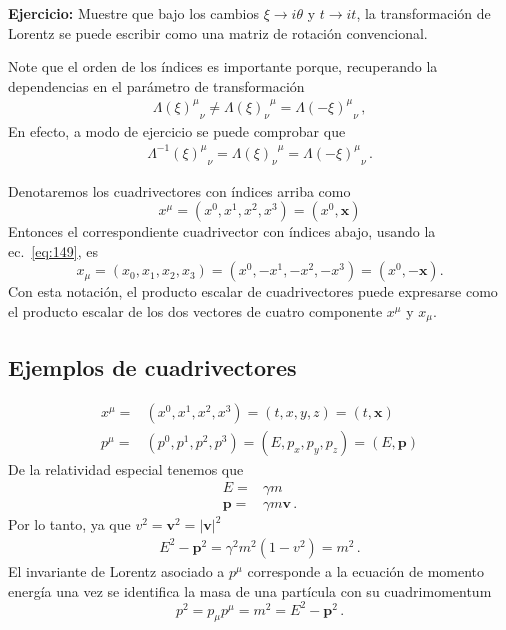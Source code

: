 \textbf{Ejercicio:} Muestre que bajo los cambios $\xi\to i\theta$ y $t\to it$, la transformación de Lorentz se puede escribir como una matriz de rotación convencional.

Note que el orden de los índices es importante porque, recuperando la dependencias en el parámetro de transformación
\begin{align}
  {\Lambda(\xi)^{\mu}}_{\nu}\ne {\Lambda(\xi)_{\nu}}^{\mu}={\Lambda(-\xi)^{\mu}}_{\nu}\,,
\end{align}
En efecto, a modo de ejercicio se puede comprobar que
\begin{align}
{\Lambda^{-1}(\xi)^{\mu}}_{\nu} ={\Lambda(\xi)_{\nu}}^{\mu}= {\Lambda(-\xi)^{\mu}}_{\nu}\,.
\end{align}


\begin{frame}
Denotaremos los cuadrivectores con índices arriba como
\begin{equation}
  \label{eq:upindx}
  x^\mu=(x^0,x^1,x^2,x^3)=(x^0,\mathbf{x})
\end{equation}
Entonces el correspondiente cuadrivector con índices abajo, usando la ec.~\eqref{eq:149}, es
\begin{equation}
  x_\mu=(x_0,x_1,x_2,x_3)=(x^0,-x^1,-x^2,-x^3)=(x^0,-\mathbf{x}).
\end{equation}
Con esta notación, el producto escalar de cuadrivectores puede expresarse como el producto escalar de los dos vectores de cuatro componente $x^\mu$ y $x_\mu$.
\subsection{Ejemplos de cuadrivectores}
\begin{align}
    x^\mu=&(x^0,x^1,x^2,x^3)=(t,x,y,z)=(t,\mathbf{x})\\
  p^\mu=&(p^0,p^1,p^2,p^3)=(E,p_x,p_y,p_z)=(E,\mathbf{p})
\end{align}
De la relatividad especial tenemos que
\begin{align}
  E=&\gamma m \nonumber\\
  \mathbf{p}=&\gamma m\mathbf{v}\,.
\end{align}
Por lo tanto, ya que $v^2=\mathbf{v}^2=|\mathbf{v}|^2$
\begin{align}
  E^2-\mathbf{p}^2=\gamma^2m^2(1-v^2)=m^2\,.
\end{align}
El invariante de Lorentz asociado a $p^\mu$ corresponde a la ecuación de momento energía una vez se identifica la masa de una partícula con su cuadrimomentum
\begin{equation}
  p^2=p_\mu p^\mu=m^2=E^2-\mathbf{p}^2\,.
\end{equation}
\end{frame}

